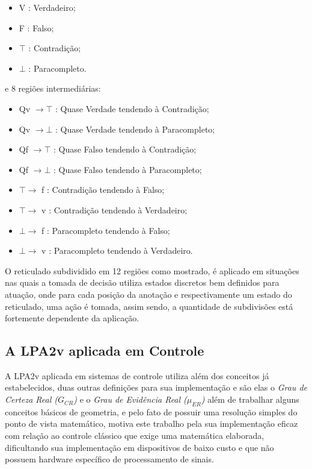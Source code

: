 \begin{itemize}
\item V : Verdadeiro;
\item F : Falso;
\item $\top$ : Contradição;
\item $\bot$ : Paracompleto.
\end{itemize}
e 8 regiões intermediárias: 
\begin{itemize}
\item Qv $\rightarrow  \top$ : Quase Verdade tendendo à Contradição;
\item Qv $\rightarrow  \bot$ : Quase Verdade tendendo à  Paracompleto;
\item Qf $\rightarrow  \top$ : Quase Falso tendendo à Contradição;
\item Qf $\rightarrow  \bot$ : Quase Falso tendendo à Paracompleto;
\item $\top \rightarrow $ f : Contradição tendendo à Falso;
\item $\top \rightarrow $ v : Contradição tendendo à Verdadeiro;
\item $\bot \rightarrow $ f : Paracompleto tendendo à Falso;
\item $\bot \rightarrow $ v : Paracompleto tendendo à Verdadeiro.

\end{itemize}

O reticulado subdividido em 12 regiões como mostrado, é aplicado em situações nas quais a tomada de decisão utiliza estados discretos bem definidos para atuação, onde para cada posição da anotação e respectivamente um estado do reticulado, uma ação é tomada, assim sendo, a quantidade de subdivisões está fortemente dependente da aplicação.



\subsection{A LPA2v aplicada em Controle}

A LPA2v aplicada em sistemas de controle utiliza além dos conceitos já estabelecidos, duas outras definições para sua implementação e são elas o \emph{ Grau de Certeza Real ($G _{CR}$)} e o \emph{Grau de Evidência Real ($\mu _{ER}$)} além de trabalhar alguns conceitos básicos de geometria, e pelo fato de possuir uma resolução simples do ponto de vista matemático, motiva este trabalho pela sua implementação eficaz com relação ao controle clássico que exige uma matemática elaborada, dificultando sua implementação em dispositivos de baixo custo e que não possuem hardware específico de processamento de sinais. 


